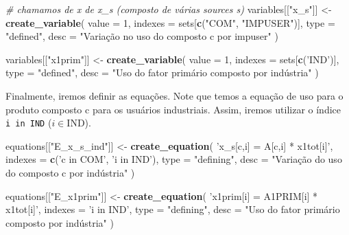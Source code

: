 \documentclass[12pt,twoside]{article}
\newenvironment{Shaded}{\begin{snugshade}}{\end{snugshade}}
\newcommand{\CommentTok}[1]{\textcolor[rgb]{0.56,0.35,0.01}{\textit{#1}}}
\newcommand{\DataTypeTok}[1]{\textcolor[rgb]{0.13,0.29,0.53}{#1}}
\newcommand{\DecValTok}[1]{\textcolor[rgb]{0.00,0.00,0.81}{#1}}
\newcommand{\KeywordTok}[1]{\textcolor[rgb]{0.13,0.29,0.53}{\textbf{#1}}}
\newcommand{\NormalTok}[1]{#1}
\newcommand{\StringTok}[1]{\textcolor[rgb]{0.31,0.60,0.02}{#1}}
\let\oldShaded\Shaded
\let\endoldShaded\endShaded
\renewenvironment{Shaded}{\footnotesize\oldShaded}{\endoldShaded}
\begin{document}
\begin{Shaded}
\begin{Highlighting}[]
\CommentTok{# chamamos de x de x_s (composto de várias sources s)}
\NormalTok{variables[[}\StringTok{"x_s"}\NormalTok{]] <-}\StringTok{ }\KeywordTok{create_variable}\NormalTok{(}
  \DataTypeTok{value =} \DecValTok{1}\NormalTok{,}
  \DataTypeTok{indexes =}\NormalTok{ sets[}\KeywordTok{c}\NormalTok{(}\StringTok{"COM"}\NormalTok{, }\StringTok{"IMPUSER"}\NormalTok{)],}
  \DataTypeTok{type =} \StringTok{"defined"}\NormalTok{,}
  \DataTypeTok{desc =} \StringTok{"Variação no uso do composto c por impuser"}
\NormalTok{)}

\NormalTok{variables[[}\StringTok{"x1prim"}\NormalTok{]] <-}\StringTok{ }\KeywordTok{create_variable}\NormalTok{(}
  \DataTypeTok{value =} \DecValTok{1}\NormalTok{,}
  \DataTypeTok{indexes =}\NormalTok{ sets[}\KeywordTok{c}\NormalTok{(}\StringTok{'IND'}\NormalTok{)],}
  \DataTypeTok{type =} \StringTok{"defined"}\NormalTok{,}
  \DataTypeTok{desc =} \StringTok{"Uso do fator primário composto por indústria"}
\StringTok{)}
\end{Highlighting}
\end{Shaded}

Finalmente, iremos definir as equações. Note que temos a equação de uso
para o produto composto c para os usuários industriais. Assim, iremos
utilizar o índice \texttt{i\ in\ IND} (\(i \in \text{IND}\)).

\begin{Shaded}
\begin{Highlighting}[]
\NormalTok{equations[[}\StringTok{"E_x_s_ind"}\NormalTok{]] <-}\StringTok{ }\KeywordTok{create_equation}\NormalTok{(}
  \StringTok{'x_s[c,i] = A[c,i] * x1tot[i]'}\NormalTok{,}
  \DataTypeTok{indexes =} \KeywordTok{c}\NormalTok{(}\StringTok{'c in COM'}\NormalTok{, }\StringTok{'i in IND'}\NormalTok{),}
  \DataTypeTok{type =} \StringTok{"defining"}\NormalTok{,}
  \DataTypeTok{desc =} \StringTok{"Variação do uso do composto c por indústria"}
\StringTok{)}
\end{Highlighting}
\end{Shaded}

\begin{Shaded}
\begin{Highlighting}[]
\NormalTok{equations[[}\StringTok{"E_x1prim"}\NormalTok{]] <-}\StringTok{ }\KeywordTok{create_equation}\NormalTok{(}
  \StringTok{'x1prim[i] = A1PRIM[i] * x1tot[i]'}\NormalTok{,}
  \DataTypeTok{indexes =} \StringTok{'i in IND'}\NormalTok{,}
  \DataTypeTok{type =} \StringTok{"defining"}\NormalTok{,}
  \DataTypeTok{desc =} \StringTok{"Uso do fator primário composto por indústria"}
\StringTok{)}
\end{Highlighting}
\end{Shaded}
\end{document}
